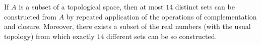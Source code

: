 If $A$ is a subset of a topological space, then at most $14$ distinct sets can be constructed from $A$ by repeated application of the operations of complementation and closure. Moreover, there exists a subset of the real numbers (with the usual topology) from which exactly $14$ different sets can be so constructed.
